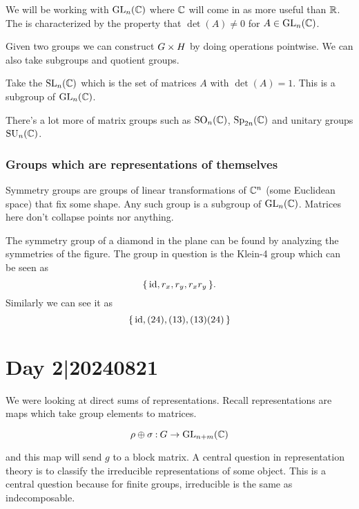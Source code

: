 \documentclass[12pt]{memoir}
\begin{document}
\begin{Ex}
We will be working with $\mathrm{GL}_n(\mathbb{C})$ where $\mathbb{C}$ will come in as more useful than $\mathbb{R}$. The  is characterized by the property that $\det(A)\neq 0$ for $A\in\mathrm{GL}_n(\mathbb{C})$.
\end{Ex}

\begin{Ex}
    Given two groups we can construct $G\times H$ by doing operations pointwise. We can also take subgroups and quotient groups. 
\end{Ex}

\begin{Ex}
    Take the  $\mathrm{SL}_n(\mathbb{C})$ which is the set of matrices $A$ with $\det(A)=1$. This is a subgroup of $\mathrm{GL}_n(\mathbb{C})$.
\end{Ex}

There's a lot more of matrix groups such as $\mathrm{SO}_n(\mathbb{C})$, $\mathrm{Sp}_{2n}(\mathbb{C})$ and unitary groups $\mathrm{SU}_n(\mathbb{C})$. 

\subsubsection{Groups which are representations of themselves}

Symmetry groups are groups of linear transformations of $\mathbb{C}^n$ (some Euclidean space) that fix some shape. Any such group is a subgroup of $\mathrm{GL}_n(\mathbb{C})$. Matrices here don't collapse points nor anything.

\begin{Ex}
    The symmetry group of a diamond in the plane can be found by analyzing the symmetries of the figure.
    The group in question is the Klein-4 group which can be seen as 
    $$\{\,\operatorname{id},r_x,r_y,r_xr_y\,\}.$$
    Similarly we can see it as 
    $$\{\,\operatorname{id},(24),(13),(13)(24)\,\}$$
\end{Ex}


\section{Day 2|20240821}

We were looking at direct sums of representations. Recall representations are maps which take group elements to matrices. 

$$\rho\oplus\sigma\mathbin{:}G\to\mathrm{GL}_{n+m}(\mathbb{C})$$

and this map will send $g$ to a block matrix. A central question in representation theory is to classify the irreducible representations of some object. This is a central question because for finite groups, irreducible is the same as indecomposable.
\end{document}
